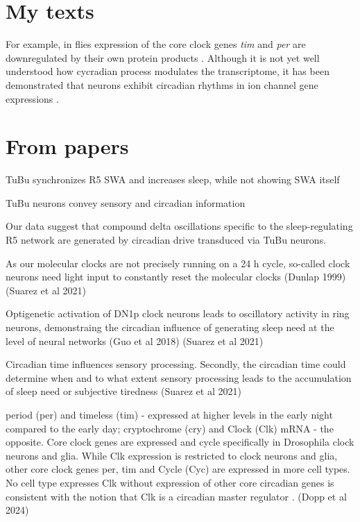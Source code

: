 \documentclass[12pt]{article}
\begin{document}
\section{My texts}

For example, in flies expression of the core clock genes \textit{tim} and \textit{per} are
downregulated by their own protein products \parencite{dubowyCircadianRhythmsSleep2017}.
Although it is not yet well understood how cycradian process modulates the transcriptome,
it has been demonstrated that neurons exhibit circadian rhythms in ion channel gene expressions
\parencite{doppSinglecellTranscriptomicsReveals2024,dubowyCircadianRhythmsSleep2017,andreaniCircadianProgrammingEllipsoid2022}.

\noindent\hrulefill

\section{From papers}

TuBu synchronizes R5 SWA and increases sleep, while not showing SWA itself \parencite{raccugliaNetworkSpecificSynchronizationElectrical2019,suarez-grimaltNeuralArchitectureSleep2021}

TuBu neurons convey sensory and circadian information \parencite{raccugliaNetworkSpecificSynchronizationElectrical2019}


Our data suggest that compound delta oscillations specific to the sleep-regulating R5
network are generated by circadian drive transduced via TuBu neurons. \parencite{raccugliaNetworkSpecificSynchronizationElectrical2019}


As our molecular clocks are not precisely running on a 24 h cycle, so-called clock neurons need light input to constantly reset the molecular
clocks (Dunlap 1999) \parencite{suarez-grimaltNeuralArchitectureSleep2021}
(Suarez et al 2021)

Optigenetic activation of DN1p clock neurons leads to oscillatory activity in ring neurons,
demonstraing the circadian influence of generating sleep need at the level of neural networks 
(Guo et al 2018) \parencite{suarez-grimaltNeuralArchitectureSleep2021}
(Suarez et al 2021)

Circadian time influences sensory processing. Secondly, the circadian time could determine
when and to what extent sensory processing leads to the accumulation of sleep need
or subjective tiredness \parencite{suarez-grimaltNeuralArchitectureSleep2021}
(Suarez et al 2021)

    
period (per) and timeless (tim) - expressed at higher levels in the early night
compared to the early day; cryptochrome (cry) and Clock (Clk) mRNA - the opposite.
Core clock genes are expressed and cycle specifically in Drosophila clock
neurons and glia. While Clk expression is restricted to clock neurons and glia,
other core clock genes per, tim and Cycle (Cyc) are expressed in more cell types.
No cell type expresses Clk without expression of other core circadian genes is
consistent with the notion that Clk is a circadian master regulator
\parencite{doppSinglecellTranscriptomicsReveals2024}.
(Dopp et al 2024)
\end{document}
